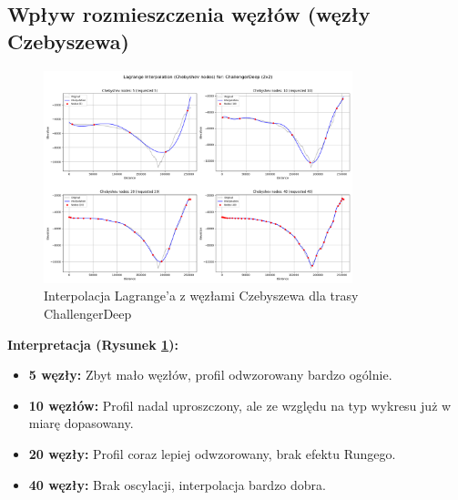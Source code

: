 \documentclass[11pt,a4paper]{article}
\begin{document}
\subsection{Wpływ rozmieszczenia węzłów (węzły Czebyszewa)}
\begin{figure}[H]
    \centering
    \includegraphics[width=0.8\textwidth]{plots/ChallengerDeep_Lagrange_Chebyshev_2x2.png}
    \caption{Interpolacja Lagrange'a z węzłami Czebyszewa dla trasy ChallengerDeep}
    \label{fig:challengerdeep_chebyshev}
\end{figure}
\textbf{Interpretacja (Rysunek \ref{fig:challengerdeep_chebyshev}):} 
\begin{itemize}
    \item \textbf{5 węzły:} Zbyt mało węzłów, profil odwzorowany bardzo ogólnie.
    \item \textbf{10 węzłów:} Profil nadal uproszczony, ale ze względu na typ wykresu już w miarę dopasowany.
    \item \textbf{20 węzły:} Profil coraz lepiej odwzorowany, brak efektu Rungego.
    \item \textbf{40 węzły:} Brak oscylacji, interpolacja bardzo dobra.
\end{itemize}
\end{document}
